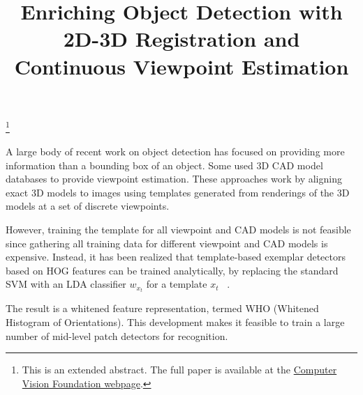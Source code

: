 \documentclass[extendedabs]{bmvc2k}
\begin{document}
\title{Enriching Object Detection with 2D-3D Registration and Continuous Viewpoint Estimation}


\maketitle
\let\thefootnote\relax\footnote{This is an extended abstract. The full paper is available at the \href{http://www.cv-foundation.org/openaccess/CVPR2015.py}{Computer Vision Foundation webpage}. }
\vspace{-0.2in}



\noindent

A large body of recent work on object detection has focused on providing more
information than a bounding box of an object. Some used 3D CAD
model databases to provide viewpoint estimation. These approaches work
by aligning exact 3D models to images using templates generated from renderings
of the 3D models at a set of discrete viewpoints.

However, training the template for all viewpoint and CAD models is not feasible
since gathering all training data for different viewpoint and CAD models is
expensive.  Instead, it has been realized that template-based exemplar
detectors based on HOG features can be trained analytically, by
replacing the standard SVM with an LDA classifier $w_{x_t}$ for a template $x_t$
~\cite{Hariharan12}.

The result is a whitened feature representation, termed WHO (Whitened Histogram
of Orientations). This development makes it feasible to train a large number of
mid-level patch detectors for recognition.
\end{document}
